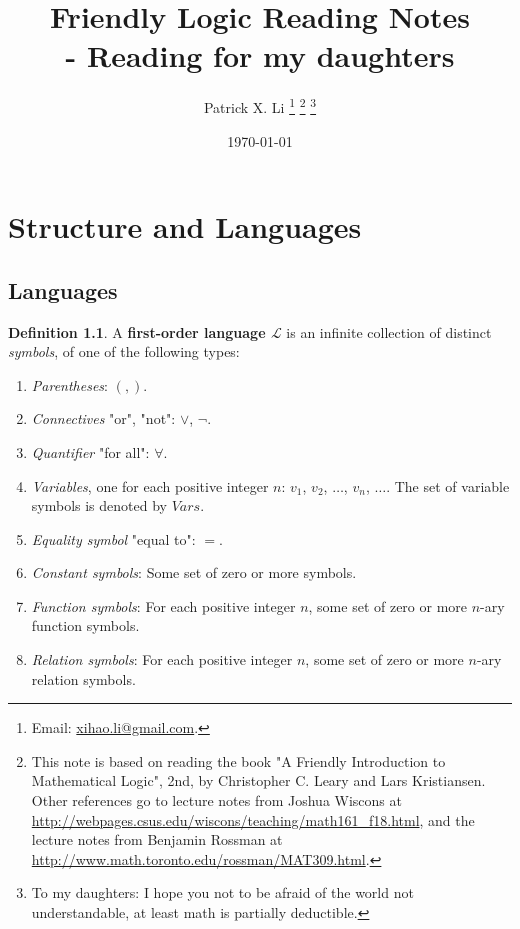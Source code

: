 \documentclass[11pt,letterpaper]{book}
\theoremstyle{definition}
\newtheorem{definition}{Definition}[section]
\begin{document}
\title{Friendly Logic Reading Notes \\  {\Large - Reading for my daughters} }
\date{\today}
\author{Patrick X. Li \thanks{Email: \url{xihao.li@gmail.com}.} \thanks{This note is based on reading the book "A Friendly Introduction to Mathematical Logic", 2nd, by Christopher C. Leary and Lars Kristiansen. Other references go to lecture notes from Joshua Wiscons at \url{http://webpages.csus.edu/wiscons/teaching/math161_f18.html}, and the lecture notes from Benjamin Rossman at \url{http://www.math.toronto.edu/rossman/MAT309.html}.} \thanks{To my daughters: I hope you not to be afraid of the world not understandable, at least math is partially deductible.} }


\maketitle

\tableofcontents


\chapter{Structure and Languages}


\section{Languages}



\begin{definition}\label{def:language}
A \textbf{first-order language $\mathcal{L}$} is an infinite collection
of distinct \emph{symbols}, of one of the following types:
\begin{enumerate}
\item{\emph{Parentheses}: $( , )$.}
\item{\emph{Connectives} "or", "not": $\lor $, $\lnot$.}
\item{\emph{Quantifier} "for all": $\forall$.}
\item{\emph{Variables}, one for each positive integer $n$: $v_1$, $v_2$,
$\ldots$, $v_n$, $\ldots$. The set of variable symbols is denoted by
$Vars$.}
\item{\emph{Equality symbol} "equal to": $=$.}
\item{\emph{Constant symbols}: Some set of zero or more symbols.}
\item{\emph{Function symbols}: For each positive integer $n$, some set
of zero or more $n$-ary function symbols.}
\item{\emph{Relation symbols}: For each positive integer $n$, some set
of zero or more $n$-ary relation symbols.}
\end{enumerate}

\end{definition}
\end{document}
